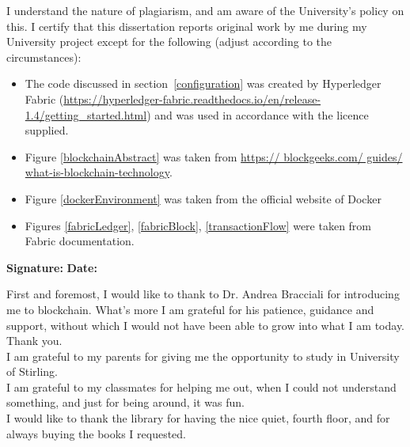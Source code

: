 \documentclass[a4paper,11pt]{report}
\begin{document}


I understand the nature of plagiarism, and am aware of the University's policy
on this. I certify that this dissertation reports original work by me during my
University project except for the following (adjust according to the
circumstances):

\begin{itemize}

  \item
  The code discussed in section~\ref{configuration} was created by Hyperledger
  Fabric (\url{https://hyperledger-fabric.readthedocs.io/en/release-1.4/getting_started.html}) and         was used in accordance with the licence supplied.

  \item Figure \ref{blockchainAbstract} was taken from \url{https:// blockgeeks.com/ guides/ what-is-blockchain-technology}.
  \item Figure \ref{dockerEnvironment} was taken from the official website of Docker
  \item Figures \ref{fabricLedger}, \ref{fabricBlock}, \ref{transactionFlow} were taken from Fabric documentation.

\end{itemize}

\bigskip

{\bf Signature:} \hspace{20em} {\bf Date:}




First and foremost, I would like to thank to Dr. Andrea Bracciali for introducing me to blockchain. What's more I am grateful for his patience, guidance and support, without which I would not have been able to grow into what I am today. Thank you.
\\

I am grateful to my parents for giving me the opportunity to study in University of Stirling. 
\\

I am grateful to my classmates for helping me out, when I could not understand something, and just for being around, it was fun. 
\\

I would like to thank the library for having the nice quiet, fourth floor, and for always buying the books I requested. 
\end{document}
